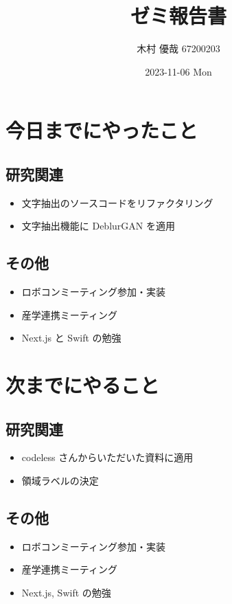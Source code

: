 \documentclass[uplatex, onecolumn, 10pt]{jsarticle}
\begin{document}
\title{\vspace{-40mm}\bf{\LARGE{ゼミ報告書}}}
\author{\vspace{-40mm}木村 優哉 67200203}
\date{2023-11-06 Mon}
\maketitle


\section{今日までにやったこと}

\subsection*{研究関連}
\begin{itemize}
	\item 文字抽出のソースコードをリファクタリング
	\item 文字抽出機能に DeblurGAN を適用
\end{itemize}

\subsection*{その他}
\begin{itemize}
	\item ロボコンミーティング参加・実装
	\item 産学連携ミーティング
	\item Next.js と Swift の勉強
\end{itemize}


\section{次までにやること}

\subsection*{研究関連}
\begin{itemize}
	\item codeless さんからいただいた資料に適用
	\item 領域ラベルの決定
\end{itemize}

\subsection*{その他}
\begin{itemize}
	\item ロボコンミーティング参加・実装
	\item 産学連携ミーティング
	\item Next.js, Swift の勉強
\end{itemize}
\end{document}
